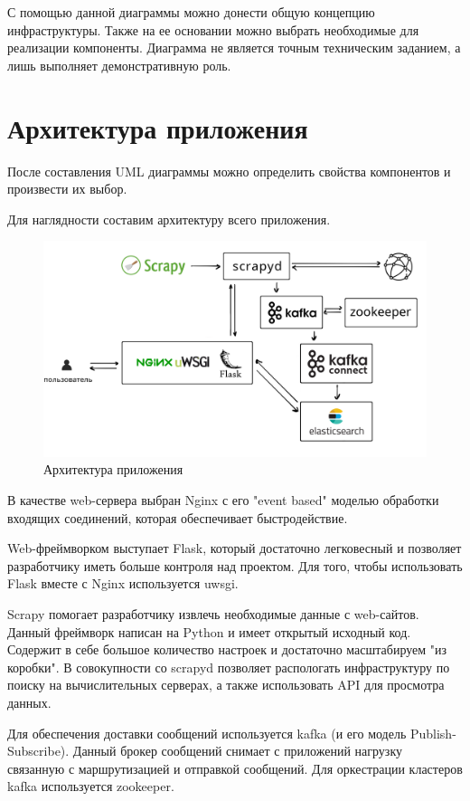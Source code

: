 С помощью данной диаграммы можно донести общую концепцию инфраструктуры. Также
на ее основании можно выбрать необходимые для реализации компоненты. Диаграмма
не является точным техническим заданием, а лишь выполняет демонстративную роль.

\section{Архитектура приложения}
После составления UML диаграммы можно определить свойства компонентов и
произвести их выбор.

Для наглядности составим архитектуру всего приложения.
\begin{figure}[H]
    \centering
    \includegraphics[scale=0.70]{inc/img/structure.png}
    \caption{Архитектура приложения}
\end{figure}

В качестве web-сервера выбран Nginx с его "event based" моделью обработки
входящих соединений, которая обеспечивает быстродействие.

Web-фреймворком выступает Flask, который достаточно легковесный и позволяет
разработчику иметь больше контроля над проектом. Для того, чтобы использовать
Flask вместе с Nginx используется uwsgi.

Scrapy помогает разработчику извлечь необходимые данные с web-сайтов. Данный
фреймворк написан на Python и имеет открытый исходный код. Содержит в себе
большое количество настроек и достаточно масштабируем "из коробки". В
совокупности со scrapyd позволяет распологать инфраструктуру по поиску на
вычислительных серверах, а также использовать API для просмотра данных.

Для обеспечения доставки сообщений используется kafka (и его модель
Publish-Subscribe). Данный брокер сообщений снимает с приложений нагрузку
связанную с маршрутизацией и отправкой сообщений. Для оркестрации кластеров
kafka используется zookeeper.

